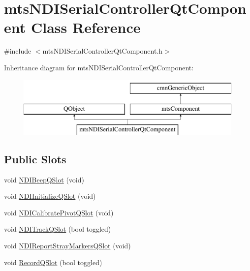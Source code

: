 \hypertarget{classmts_n_d_i_serial_controller_qt_component}{\section{mts\-N\-D\-I\-Serial\-Controller\-Qt\-Component Class Reference}
\label{classmts_n_d_i_serial_controller_qt_component}
}


{\ttfamily \#include $<$mts\-N\-D\-I\-Serial\-Controller\-Qt\-Component.\-h$>$}

Inheritance diagram for mts\-N\-D\-I\-Serial\-Controller\-Qt\-Component\-:\begin{figure}[H]
\begin{center}
\leavevmode
\includegraphics[height=3.000000cm]{db/d54/classmts_n_d_i_serial_controller_qt_component}
\end{center}
\end{figure}
\subsection*{Public Slots}
\begin{DoxyCompactItemize}
\item 
void \hyperlink{classmts_n_d_i_serial_controller_qt_component_a6ee96152ae23b8560a571372ed11812b}{N\-D\-I\-Beep\-Q\-Slot} (void)
\item 
void \hyperlink{classmts_n_d_i_serial_controller_qt_component_a3e6933e09cde1eae1bdc565e6f0b4739}{N\-D\-I\-Initialize\-Q\-Slot} (void)
\item 
void \hyperlink{classmts_n_d_i_serial_controller_qt_component_adb8f93a1da10a9ba7bba00448d1691e6}{N\-D\-I\-Calibrate\-Pivot\-Q\-Slot} (void)
\item 
void \hyperlink{classmts_n_d_i_serial_controller_qt_component_a9d5912bdd1098c27ff09254541e58de2}{N\-D\-I\-Track\-Q\-Slot} (bool toggled)
\item 
void \hyperlink{classmts_n_d_i_serial_controller_qt_component_a0debe2072c83040238578397eed8793e}{N\-D\-I\-Report\-Stray\-Markers\-Q\-Slot} (void)
\item 
void \hyperlink{classmts_n_d_i_serial_controller_qt_component_acf2db3da376b6583e05d92347e16cc40}{Record\-Q\-Slot} (bool toggled)
\end{DoxyCompactItemize}

